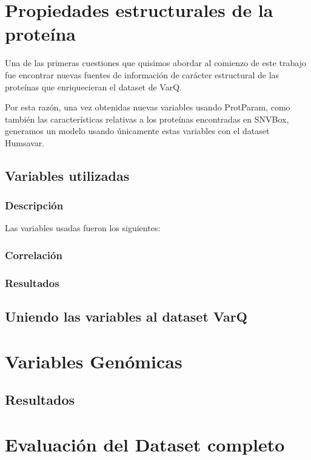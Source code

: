 \section{Propiedades estructurales de la proteína}

Una de las primeras cuestiones que quisimos abordar al comienzo de este trabajo fue encontrar nuevas fuentes de información de carácter estructural de las proteínas que enriquecieran el dataset de VarQ. 

Por esta razón, una vez obtenidas nuevas variables usando ProtParam, como también las características relativas a los proteínas encontradas en SNVBox, generamos un modelo usando únicamente estas variables con el dataset Humsavar. 


\subsection{Variables utilizadas}


\subsubsection{Descripción}

Las variables usadas fueron los siguientes:



\subsubsection{Correlación}


\subsubsection{Resultados}

\subsection{Uniendo las variables al dataset VarQ}

\section{Variables Genómicas}
\subsection{Resultados}

\section{Evaluación del Dataset completo}


